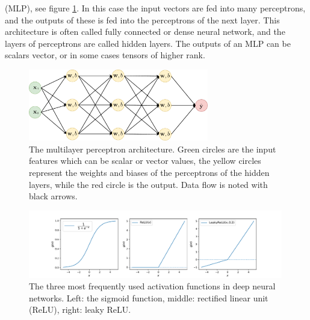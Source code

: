 \documentclass[12pt, a4paper,  nobibnotes]{article}
\begin{document}
(MLP), see figure \ref{fig:MLP}. In this case the input vectors are fed into many perceptrons, and the 
outputs of these is fed into the perceptrons of the next layer. This architecture is often called 
fully connected or dense neural network, and the layers of perceptrons are called hidden layers. 
The outputs of an MLP can be scalars vector, or in some cases tensors of higher rank.
\begin{figure}[H]
    \centering
    \includegraphics[width=0.7\textwidth]{figures/MLP.pdf}
    \caption{The multilayer perceptron architecture. Green circles are the input features which 
    can be scalar or vector values, the yellow circles represent the weights and biases of the 
    perceptrons of the hidden layers, while the red circle is the output. Data flow is noted with 
    black arrows.}
    \label{fig:MLP}
\end{figure}
\begin{figure}[H]
    \centering
    \includegraphics[width=0.99\textwidth]{figures/activation_functions.pdf}
    \caption{The three most frequently used activation functions in deep neural networks.
    Left: the sigmoid function, middle: rectified linear unit (ReLU), right: leaky ReLU.}
    \label{fig:activations}
\end{figure}
\end{document}
